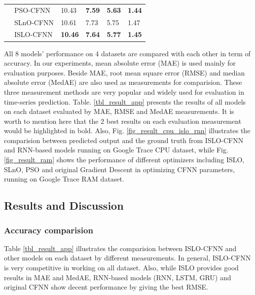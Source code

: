 \documentclass[a4paper,13pt,2p]{report}
\begin{document}
\begin{table}[!t]
\begin{tabular}{|l|l|l|l|l|l|}
                                     & PSO-CFNN  & 10.43           & \textbf{7.59}   & \textbf{5.63}  & \textbf{1.44} \\ \cline{2-6} 
                                     & SLnO-CFNN & 10.61           & 7.73            & 5.75           & 1.47          \\ \cline{2-6} 
                                     & ISLO-CFNN & \textbf{10.46}  & \textbf{7.64}   & \textbf{5.77}  & \textbf{1.45} \\ \hline
\end{tabular}
\end{table}

	All 8 models' performance on 4 datasets are compared with each other in term of accuracy. In our experiments, mean absolute error (MAE) is used mainly for evaluation purposes. Beside MAE, root mean square error (RMSE) and median absolute error	(MedAE) are also used as measurements for comparision. These three measurement methods are very popular and widely used for evaluation in time-series prediction. Table. \ref{tbl_result_app} presents the results of all models on each dataset evaluated by MAE, RMSE and MedAE measurements. It is worth to mention here that the 2 best results on each evaluation measurement would be highlighted in bold. Also, Fig. \ref{fig_result_cpu_islo_rnn} illustrates the comparision between predicted output and the ground truth from ISLO-CFNN and RNN-based models running on Google Trace CPU dataset, while Fig. \ref{fig_result_ram} shows the performance of different optimizers including ISLO, SLnO, PSO and original Gradient Descent in optimizing CFNN parameters, running on Google Trace RAM dataset.



\subsection{Results and Discussion}  
\label{Results_app}
\subsubsection{Accuracy comparision}
	Table \ref{tbl_result_app} illustrates the comparision between ISLO-CFNN and other models on each dataset by different measurements. In general, ISLO-CFNN is very competitive in working on all dataset. Also, while ISLO provides good results in MAE and MedAE, RNN-based models (RNN, LSTM, GRU) and original CFNN show decent performance by giving the best RMSE.
	
\end{document}
